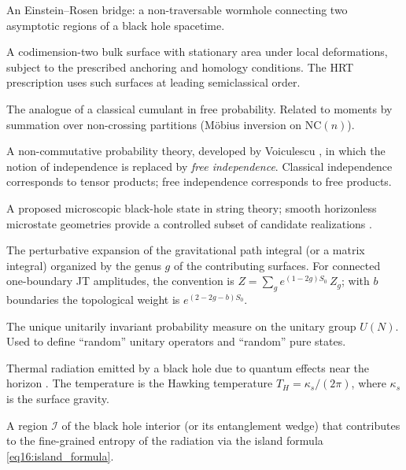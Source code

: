 \documentclass[11pt,letterpaper]{article}
\theoremstyle{plain}
\theoremstyle{definition}
\theoremstyle{remark}
\begin{document}
\begin{description}[style=nextline, leftmargin=2.5cm, labelwidth=2.3cm]
\item[ER bridge]
An Einstein--Rosen bridge: a non-traversable wormhole connecting two
asymptotic regions of a black hole spacetime.

\item[Extremal surface]
A codimension-two bulk surface with stationary area under local deformations,
subject to the prescribed anchoring and homology conditions. The HRT
prescription uses such surfaces at leading semiclassical order.

\item[Free cumulant]
The analogue of a classical cumulant in free probability.  Related to moments
by summation over non-crossing partitions (M\"obius inversion on
$\mathrm{NC}(n)$).

\item[Free probability]
A non-commutative probability theory, developed by Voiculescu
\cite{voiculescu1991}, in which the notion of independence is replaced by
\emph{free independence}.  Classical independence corresponds to tensor
products; free independence corresponds to free products.

\item[Fuzzball]
A proposed microscopic black-hole state in string theory; smooth horizonless
microstate geometries provide a controlled subset of candidate realizations \cite{mathur2005}.

\item[Genus expansion]
The perturbative expansion of the gravitational path integral (or a matrix
integral) organized by the genus $g$ of the contributing surfaces. For
connected one-boundary JT amplitudes, the convention is
$Z = \sum_g e^{(1-2g)S_0}\, Z_g$; with $b$ boundaries the topological
weight is $e^{(2-2g-b)S_0}$.

\item[Haar measure]
The unique unitarily invariant probability measure on the unitary group
$U(N)$.  Used to define ``random'' unitary operators and ``random'' pure states.

\item[Hawking radiation]
Thermal radiation emitted by a black hole due to quantum effects near the
horizon \cite{hawking1975}.  The temperature is the Hawking temperature
$T_H = \kappa_s/(2\pi)$, where $\kappa_s$ is the surface gravity.

\item[Island]
A region $\mathcal{I}$ of the black hole interior (or its entanglement wedge)
that contributes to the fine-grained entropy of the radiation via the island
formula \eqref{eq16:island_formula}.


\end{description}
\end{document}
